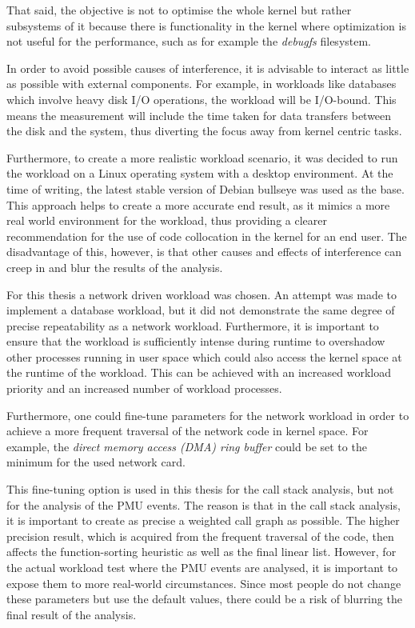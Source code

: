 That said, the objective is not to optimise the whole kernel but rather subsystems of it because there is functionality in the kernel where optimization is not useful for the performance, such as for example the \textit{debugfs} filesystem.

In order to avoid possible causes of interference, it is advisable to interact as little as possible with external components. For example, in workloads like databases which involve heavy disk I/O operations, the workload will be I/O-bound. This means the measurement will include the time taken for data transfers between the disk and the system, thus diverting the focus away from kernel centric tasks.

Furthermore, to create a more realistic workload scenario, it was decided to run the workload on a Linux operating system with a desktop environment. At the time of writing, the latest stable version of Debian bullseye was used as the base. This approach helps to create a more accurate end result, as it mimics a more real world environment for the workload, thus providing a clearer recommendation for the use of code collocation in the kernel for an end user. The disadvantage of this, however, is that other causes and effects of interference can creep in and blur the results of the analysis.

For this thesis a network driven workload was chosen. An attempt was made to implement a database workload, but it did not demonstrate the same degree of precise repeatability as a network workload. Furthermore, it is important to ensure that the workload is sufficiently intense during runtime to overshadow other processes running in user space which could also access the kernel space at the runtime of the workload. This can be achieved with an increased workload priority and an increased number of workload processes.

Furthermore, one could fine-tune parameters for the network workload in order to achieve a more frequent traversal of the network code in kernel space. For example, the \textit{direct memory access (DMA) ring buffer} could be set to the minimum for the used network card.

\enlargethispage{3\baselineskip}
This fine-tuning option is used in this thesis for the call stack analysis, but not for the analysis of the PMU events. The reason is that in the call stack analysis, it is important to create as precise a weighted call graph as possible. The higher precision result, which is acquired from the frequent traversal of the code, then affects the function-sorting heuristic as well as the final linear list. However, for the actual workload test where the PMU events are analysed, it is important to expose them to more real-world circumstances. Since most people do not change these parameters but use the default values, there could be a risk of blurring the final result of the analysis.

